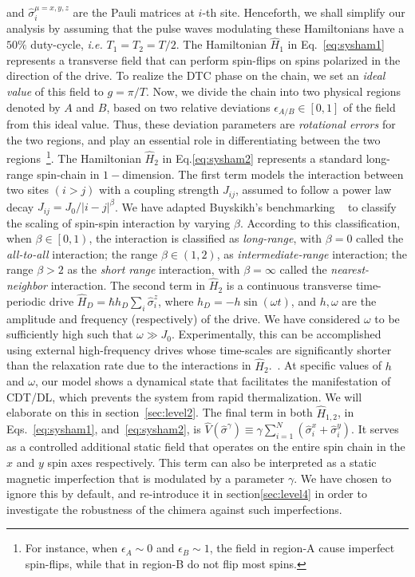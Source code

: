 \documentclass[
nofootinbib,
reprint,
superscriptaddress,
amsmath,amssymb,showkeys,
aps,
prb,
]{revtex4-2}
\begin{document}
	and $\hat{\sigma}^{\mu=x,y,z}_i$ are the Pauli matrices at $i$-th site.  Henceforth, we shall simplify our analysis by assuming that the pulse waves modulating these Hamiltonians have a $50 \%$ duty-cycle, \textit{i.e.} $T_1=T_2=T/2$.  The Hamiltonian $\hat{H}_1$ in Eq.~\eqref{eq:sysham1} represents a transverse field that can perform spin-flips on spins polarized in the direction of the drive. To realize the DTC phase on the chain, we set an \textit{ideal value} of this field to $g=\pi/T$. Now, we divide the chain into two physical regions denoted by $A$ and $B$, based on two relative deviations $\epsilon_{A/B}\in[0,1]$ of the field from this ideal value. Thus, these deviation parameters are \textit{rotational errors} for the two regions, and play an essential role in differentiating between the two regions~\footnote{For instance, when $\epsilon_A \sim 0$ and $\epsilon_B \sim 1$, the field in region-A cause imperfect spin-flips, while that in region-B do not flip most spins.}. 
	The Hamiltonian $\hat{H}_2$ in Eq.\eqref{eq:sysham2} represents a standard long-range spin-chain in $1-$dimension. The first term models the interaction between two sites $(i>j)$ with a coupling strength $J_{ij}$, assumed to follow a power law decay $J_{ij}={J_0}/{|i-j|^\beta}$. We have adapted Buyskikh's benchmarking ~\cite{buyskikh_entanglement_2016} to classify the scaling of spin-spin interaction by varying $\beta$. According to this classification, when $\beta\in\left[0,1\right)$, the interaction is classified as \textit{long-range}, with $\beta=0$ called the \textit{all-to-all} interaction; the range $\beta\in \left(1,2\right)$, as \textit{intermediate-range} interaction; the range $\beta > 2$ as the  \textit{short range} interaction, with $\beta= \infty$ called the \textit{nearest-neighbor} interaction. The second term in $\hat{H}_2$ is a continuous transverse time-periodic drive $\displaystyle \hat{H}_D=\hbar h_D \sum_i\hat{\sigma}^z_i$, where $\displaystyle h_D = -h\sin{(\omega t)}$, and $h,\omega$ are the amplitude and frequency (respectively) of the drive. We have considered $\omega$ to be sufficiently high such that $\omega\gg J_0$. 	Experimentally, this can be accomplished using external high-frequency drives whose time-scales are significantly shorter than the relaxation rate due to the interactions in $\hat{H}_2$.~\cite{choi_observation_2017,zhang_observation_2017,Cirac_1995,Blatt_2012}. At specific values of $h$ and $\omega$, our model shows a dynamical state that facilitates the manifestation of CDT/DL, which prevents the system from rapid thermalization. We will elaborate on this in section~\ref{sec:level2}. The final term in both $\hat{H}_{1,2}$, in Eqs.~\eqref{eq:sysham1}, and~\eqref{eq:sysham2}, is $\displaystyle \hat{V}(\hat{\sigma}^{\gamma}) \equiv\gamma  \sum_{i=1}^{N} (\hat{\sigma}^x_i + \hat{\sigma}^y_i)$. It serves as a controlled additional static field that operates on the entire spin chain in the $x$ and $y$ spin axes respectively.  This term can also be interpreted as a static magnetic imperfection that is modulated by a parameter $\gamma$. We have chosen to ignore this by default, and re-introduce it in section\ref{sec:level4} in order to investigate the robustness of the chimera against such imperfections.
\end{document}
